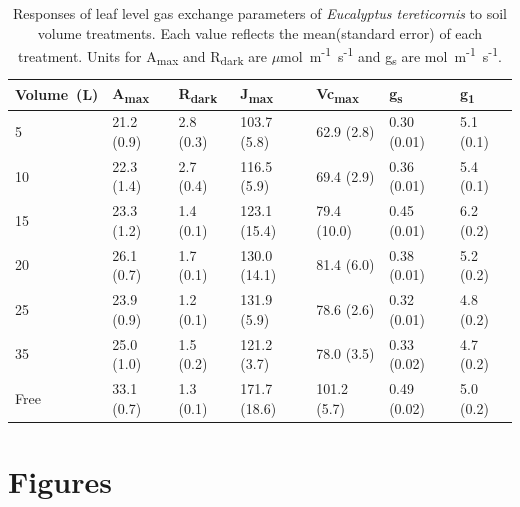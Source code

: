 \documentclass[a4paper]{article}\usepackage[]{graphicx}\usepackage[]{color}
\begin{document}
\begin{table}
\centering
\caption{Responses of leaf level gas exchange parameters of \textit{Eucalyptus tereticornis} to soil volume treatments. Each value reflects the mean(standard error) of each treatment. Units for A\textsubscript{max} and R\textsubscript{dark} are $\mu$mol~m\textsuperscript{-1}~s\textsuperscript{-1} and g\textsubscript{s} are mol~m\textsuperscript{-1}~s\textsuperscript{-1}.} 
\label{table:Table2}
\begin{tabular}{lllllll}
  \hline
Volume~(L) & A\textsubscript{max} & R\textsubscript{dark} & J\textsubscript{max} & Vc\textsubscript{max} & g\textsubscript{s} & g\textsubscript{1} \\ 
  \hline
5 & 21.2 (0.9) & 2.8 (0.3) & 103.7 (5.8) & 62.9 (2.8) & 0.30 (0.01) & 5.1 (0.1) \\ 
  10 & 22.3 (1.4) & 2.7 (0.4) & 116.5 (5.9) & 69.4 (2.9) & 0.36 (0.01) & 5.4 (0.1) \\ 
  15 & 23.3 (1.2) & 1.4 (0.1) & 123.1 (15.4) & 79.4 (10.0) & 0.45 (0.01) & 6.2 (0.2) \\ 
  20 & 26.1 (0.7) & 1.7 (0.1) & 130.0 (14.1) & 81.4 (6.0) & 0.38 (0.01) & 5.2 (0.2) \\ 
  25 & 23.9 (0.9) & 1.2 (0.1) & 131.9 (5.9) & 78.6 (2.6) & 0.32 (0.01) & 4.8 (0.2) \\ 
  35 & 25.0 (1.0) & 1.5 (0.2) & 121.2 (3.7) & 78.0 (3.5) & 0.33 (0.02) & 4.7 (0.2) \\ 
  Free & 33.1 (0.7) & 1.3 (0.1) & 171.7 (18.6) & 101.2 (5.7) & 0.49 (0.02) & 5.0 (0.2) \\ 
   \hline
\end{tabular}
\end{table}




\clearpage
\section*{Figures}
\end{document}
